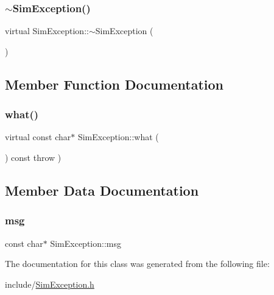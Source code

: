 \subsubsection{\texorpdfstring{$\sim$\+Sim\+Exception()}{~SimException()}}
{\footnotesize\ttfamily virtual Sim\+Exception\+::$\sim$\+Sim\+Exception (\begin{DoxyParamCaption}{ }\end{DoxyParamCaption})\hspace{0.3cm}{\ttfamily [virtual]}}



\subsection{Member Function Documentation}
\mbox{\label{class_sim_exception_a7b759030340d1299a2eeb40c6f67a926}} 
\subsubsection{\texorpdfstring{what()}{what()}}
{\footnotesize\ttfamily virtual const char$\ast$ Sim\+Exception\+::what (\begin{DoxyParamCaption}{ }\end{DoxyParamCaption}) const throw  ) \hspace{0.3cm}{\ttfamily [virtual]}}



\subsection{Member Data Documentation}
\mbox{\label{class_sim_exception_a1b07ee928b1ece4a807801a14713148a}} 
\subsubsection{\texorpdfstring{msg}{msg}}
{\footnotesize\ttfamily const char$\ast$ Sim\+Exception\+::msg\hspace{0.3cm}{\ttfamily [private]}}



The documentation for this class was generated from the following file\+:\begin{DoxyCompactItemize}
\item 
include/\hyperlink{_sim_exception_8h}{Sim\+Exception.\+h}\end{DoxyCompactItemize}
